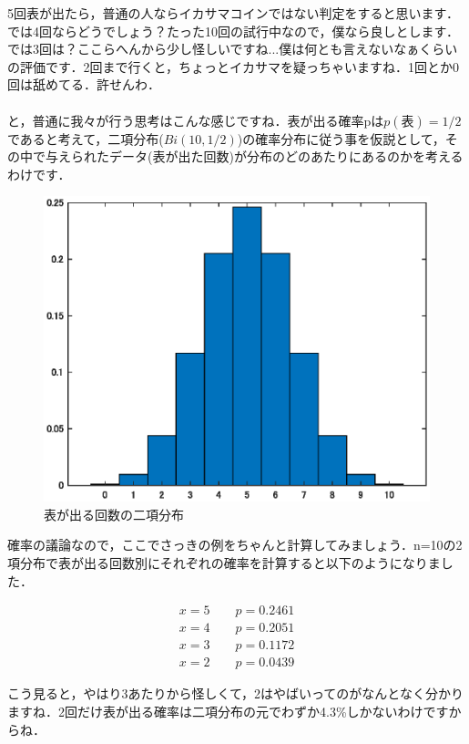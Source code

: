 \documentclass[11pt,a4paper]{ujreport} 	%
\begin{document}
5回表が出たら，普通の人ならイカサマコインではない判定をすると思います．では4回ならどうでしょう？たった10回の試行中なので，僕なら良しとします．では3回は？ここらへんから少し怪しいですね...僕は何とも言えないなぁくらいの評価です．2回まで行くと，ちょっとイカサマを疑っちゃいますね．1回とか0回は舐めてる．許せんわ．\\\\

と，普通に我々が行う思考はこんな感じですね．表が出る確率pは$p(表)=1/2$であると考えて，二項分布($Bi(10,1/2)$)の確率分布に従う事を仮説として，その中で与えられたデータ(表が出た回数)が分布のどのあたりにあるのかを考えるわけです．

\begin{figure}[H]
    \centering
    \includegraphics[width=120mm]{../figures/bino.eps}
    \caption{表が出る回数の二項分布}
\end{figure}

確率の議論なので，ここでさっきの例をちゃんと計算してみましょう．n=10の2項分布で表が出る回数別にそれぞれの確率を計算すると以下のようになりました．

\begin{align}
  x=5 \qquad p = 0.2461 \nonumber \\
  x=4 \qquad p = 0.2051 \nonumber \\
  x=3 \qquad p = 0.1172 \nonumber\\
  x=2 \qquad p = 0.0439 \nonumber
\end{align}

こう見ると，やはり3あたりから怪しくて，2はやばいってのがなんとなく分かりますね．2回だけ表が出る確率は二項分布の元でわずか4.3\%しかないわけですからね．\\
\\
\end{document}
